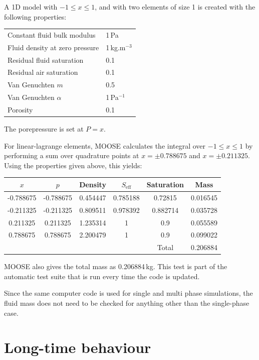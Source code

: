 \documentclass[]{scrreprt}
\begin{document}
A 1D model with $-1\leq x \leq 1$, and with two elements of size 1 is
created with the following properties:
\begin{center}
\begin{tabular}{|ll|}
\hline
Constant fluid bulk modulus & 1\,Pa \\
Fluid density at zero pressure & 1\,kg.m$^{-3}$ \\
Residual fluid saturation & 0.1 \\
Residual air saturation & 0.1 \\
Van Genuchten $m$ & 0.5 \\
Van Genuchten $\alpha$ & 1\,Pa$^{-1}$ \\
Porosity & 0.1 \\
\hline
\end{tabular} 
\end{center}
The porepressure is set at $P=x$.

For linear-lagrange elements, MOOSE calculates the integral over
$-1\leq x \leq 1$ by performing a sum over quadrature points at
$x=\pm 0.788675$ and $x=\pm 0.211325$.
Using the properties given above, this yields:
\begin{center}
\begin{tabular}{|cccccc|}
\hline
$x$ & $p$ & Density & $S_{\mathrm{eff}}$ & Saturation & Mass \\
\hline
-0.788675 & -0.788675 & 0.454447 & 0.785188 & 0.72815 & 0.016545 \\
-0.211325 & -0.211325 & 0.809511 & 0.978392 & 0.882714 & 0.035728 \\
0.211325 & 0.211325 & 1.235314 & 1 & 0.9 & 0.055589 \\
0.788675 & 0.788675 & 2.200479 & 1 & 0.9 & 0.099022 \\
\hline
 & & & & Total & 0.206884 \\
\hline
\end{tabular} 
\end{center}
MOOSE also gives the total mass as 0.206884\,kg.  This test is part of
the automatic test suite that is run every time the code is updated.

Since the same computer code is used for single and multi phase
simulations, the fluid mass does not need to be checked for anything
other than the single-phase case.





\chapter{Long-time behaviour}
\label{gh}
\end{document}
